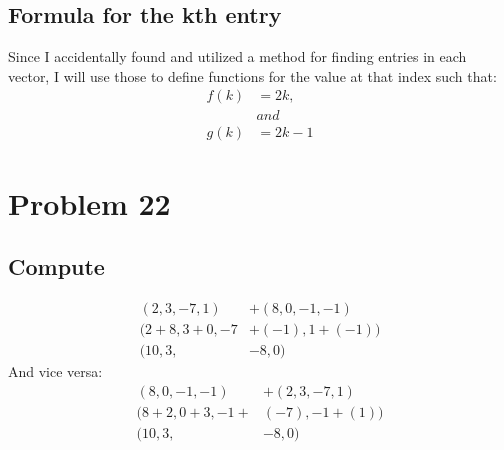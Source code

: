 \documentclass{article}
\begin{document}
\subsection{Formula for the kth entry}
Since I accidentally found and utilized a method for finding entries in each
vector, I will use those to define functions for the value at that index such
that:\\
\begin{equation*}
\begin{split}
f(k)&=2k,\\
&and\\
g(k)&=2k-1
\end{split}
\end{equation*}
\newpage
\section{Problem 22}
\subsection{Compute}
\begin{equation*}
\begin{split}
(2, 3, -7, 1) &+ (8, 0, -1, -1)\\
(2+8, 3+0, -7&+(-1), 1+(-1))\\
(10,3,&-8,0)
\end{split}
\end{equation*}
And vice versa:\\
\begin{equation*}
\begin{split}
(8, 0, -1, -1) &+ (2, 3, -7, 1)\\
(8+2, 0+3, -1+&(-7), -1+(1))\\
(10, 3, &-8, 0)\\
\end{split}
\end{equation*}
\end{document}
